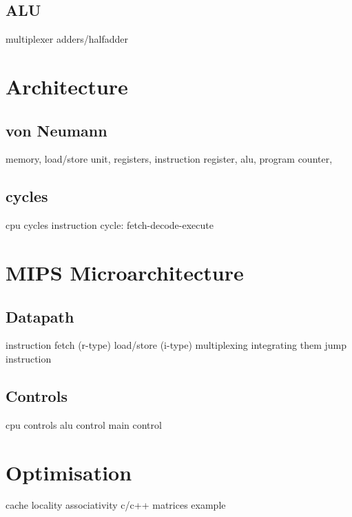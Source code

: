 \subsection{ALU}
multiplexer
adders/halfadder

\section{Architecture}
\subsection{von Neumann}
memory, load/store unit, registers, instruction register, alu, program counter, 

\subsection{cycles}
cpu cycles
instruction cycle: fetch-decode-execute

\section{MIPS Microarchitecture}
\subsection{Datapath}
instruction fetch (r-type)
load/store (i-type)
multiplexing
integrating them
jump instruction

\subsection{Controls}
cpu controls
alu control
main control

\section{Optimisation}
cache
locality
associativity
c/c++ matrices example